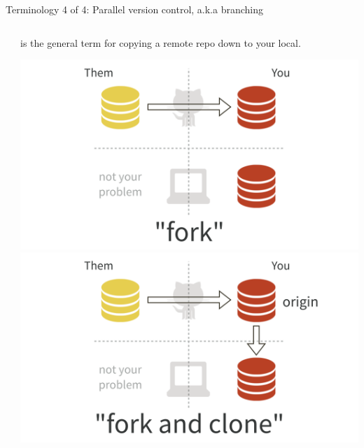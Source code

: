 \documentclass[ignorenonframetext, 10pt, aspectratio=169]{beamer}
\begin{document}
\begin{frame}{Terminology 4 of 4: Parallel version control, a.k.a branching}
\begin{columns}[T]
\begin{column}{0.3\textwidth}
\end{column}

\begin{column}{0.25\textwidth}
is the general term for copying a remote repo down to your local.\\

\smallskip

\includegraphics[width = 1.25\linewidth]{fork.png}\\

\includegraphics[width = 1.25\linewidth]{fork-and-clone.png}
\end{column}

\end{columns}
\end{frame}
\end{document}
